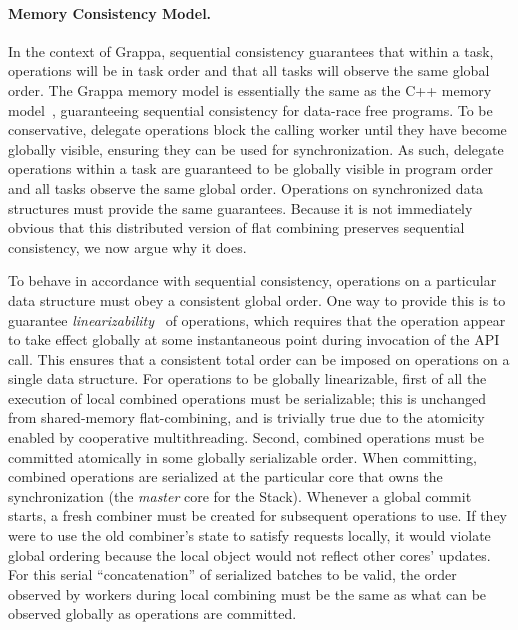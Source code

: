 \paragraph{Memory Consistency Model.}
\label{sec:memory-model}
In the context of Grappa, sequential consistency guarantees that within a
task, operations will be in task order and that all tasks will observe the
same global order.
The Grappa memory model is essentially the same as the C++ memory
model~\cite{boehm:drf0,N2480,N2800}, guaranteeing sequential
consistency for data-race free programs. To be conservative, delegate
operations block the calling worker until they have become globally visible,
ensuring they can be used for synchronization. As such, delegate operations
within a task are guaranteed to be globally visible in program order and all
tasks observe the same global order.
Operations on synchronized data structures must provide the same guarantees.
Because it is not immediately obvious
that this distributed version of flat combining preserves sequential
consistency, we now argue why it does.

To behave in accordance with sequential consistency, operations on a particular data structure must obey a consistent global order.
One way to provide this is to guarantee \emph{linearizability}~\cite{herlihy1990linearizability} of operations, which requires that the operation appear to take effect globally at some instantaneous point during invocation of the API call. This ensures that a consistent total order can be imposed on operations on a single data structure.
For operations to be globally linearizable, first of all the execution of local combined operations must be serializable;
this is unchanged from shared-memory flat-combining, and is trivially true due to the atomicity enabled by cooperative multithreading.
Second, combined operations must be committed atomically in some globally serializable order.
When committing, combined operations are serialized at the particular core that owns the synchronization (the \emph{master} core for the Stack).
Whenever a global commit starts, a fresh combiner must be created for subsequent operations to use. If they were to use the old combiner's state to satisfy requests locally, it would violate global ordering because the local object would not reflect other cores' updates.
For this serial ``concatenation'' of serialized batches to be valid, the order observed by workers during local combining must be the same as what can be observed globally as operations are committed.

